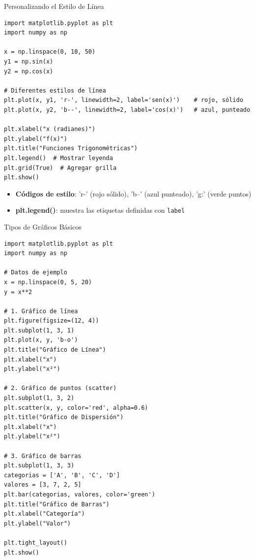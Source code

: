 \documentclass[10pt]{beamer}
\begin{document}
\begin{frame}[fragile]{Personalizando el Estilo de Línea}
\begin{verbatim}
import matplotlib.pyplot as plt
import numpy as np

x = np.linspace(0, 10, 50)
y1 = np.sin(x)
y2 = np.cos(x)

# Diferentes estilos de línea
plt.plot(x, y1, 'r-', linewidth=2, label='sen(x)')    # rojo, sólido
plt.plot(x, y2, 'b--', linewidth=2, label='cos(x)')   # azul, punteado

plt.xlabel("x (radianes)")
plt.ylabel("f(x)")
plt.title("Funciones Trigonométricas")
plt.legend()  # Mostrar leyenda
plt.grid(True)  # Agregar grilla
plt.show()
\end{verbatim}

\begin{itemize}
  \item \textbf{Códigos de estilo}: 'r-' (rojo sólido), 'b--' (azul punteado), 'g:' (verde puntos)
  \item \textbf{plt.legend()}: muestra las etiquetas definidas con \texttt{label}
\end{itemize}
\end{frame}

\begin{frame}[fragile]{Tipos de Gráficos Básicos}
\begin{verbatim}
import matplotlib.pyplot as plt
import numpy as np

# Datos de ejemplo
x = np.linspace(0, 5, 20)
y = x**2

# 1. Gráfico de línea
plt.figure(figsize=(12, 4))
plt.subplot(1, 3, 1)
plt.plot(x, y, 'b-o')
plt.title("Gráfico de Línea")
plt.xlabel("x")
plt.ylabel("x²")

# 2. Gráfico de puntos (scatter)
plt.subplot(1, 3, 2)
plt.scatter(x, y, color='red', alpha=0.6)
plt.title("Gráfico de Dispersión")
plt.xlabel("x")
plt.ylabel("x²")

# 3. Gráfico de barras
plt.subplot(1, 3, 3)
categorias = ['A', 'B', 'C', 'D']
valores = [3, 7, 2, 5]
plt.bar(categorias, valores, color='green')
plt.title("Gráfico de Barras")
plt.xlabel("Categoría")
plt.ylabel("Valor")

plt.tight_layout()
plt.show()
\end{verbatim}
\end{frame}
\end{document}
